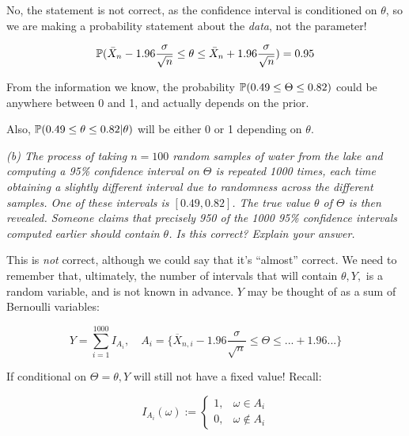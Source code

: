 \documentclass[a4paper]{article}
\begin{document}
                No, the statement is not correct, as the confidence interval is
                conditioned on $\theta$, so we are making a probability
                statement about the \textit{data}, not the parameter!

                \[
                    \mathbb{P}(\bar X_n - 1.96 \frac{\sigma}{\sqrt{n}} \leq \theta
                    \leq \bar X_n + 1.96 \frac{\sigma}{\sqrt{n}}) = 0.95
                \]

                From the information we know, the probability $\mathbb{P}(0.49 \leq
                \Theta \leq 0.82)$ could be anywhere between 0 and 1, and
                actually depends on the prior.

                Also, $\mathbb{P}(0.49 \leq \theta \leq 0.82 | \theta)$ will be
                either 0 or 1 depending on $\theta$.

            \textit{(b) The process of taking $n = 100$ random samples of water
            from the lake and computing a 95\% confidence interval on $\Theta$
            is repeated 1000 times, each time obtaining a slightly different
            interval due to randomness across the different samples. One of
            these intervals is $[0.49, 0.82]$. The true value $\theta$ of
            $\Theta$ is then revealed. Someone claims that precisely 950 of the
            1000 95\% confidence intervals computed earlier should contain
            $\theta$. Is this correct? Explain your answer.}

                This is \textit{not} correct, although we could say that it's
                ``almost'' correct. We need to remember that, ultimately, the
                number of intervals that will contain $\theta, Y,$ is a random
                variable, and is not known in advance. $Y$ may be thought of as
                a sum of Bernoulli variables:

                \[
                    Y = \sum_{i=1}^{1000} I_{A_i}, \quad A_i =\{\overline
                    X_{n,i} - 1.96 \frac{\sigma}{\sqrt{n}} \leq \Theta \leq ...
                    + 1.96 ... \}
                \]

                If conditional on $\Theta = \theta, Y$ will still not have a
                fixed value! Recall:

                \[
                    I_{A_i}(\omega) := \begin{cases}1, & \omega \in A_i \\ 0, &
                    \omega \not \in A_i\end{cases}
                \]
\end{document}
